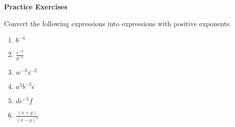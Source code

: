 \textbf{Practice Exercises}

\vspce

Convert the following expressions into expressions with positive exponents.

\begin{enumerate}[label = \arabic*. ]

\item \hspce $b^{-4}$
\item \hspce $\displaystyle \frac{c^{-3}}{d^{-8}}$
\item \hspce $w^{-3}z^{-2}$
\item \hspce $a^{3}b^{-3}c$
\item \hspce $de^{-5}f$
\item \hspce $\displaystyle \frac{(x+y)}{(x-y)^{0}}$

\end{enumerate}
